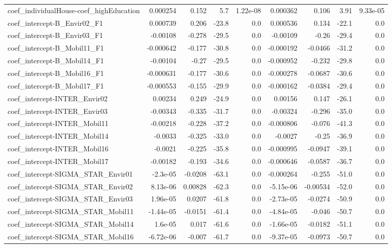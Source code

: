 \begin{tabular}{lrrrrrrrr}
coef_individualHouse-coef_highEducation & 0.000254 & 0.152 & 5.7 & 1.22e-08 & 0.000362 & 0.106 & 3.91 & 9.33e-05 \\
coef_intercept-B_Envir02_F1 & 0.000739 & 0.206 & -23.8 & 0.0 & 0.000536 & 0.134 & -22.1 & 0.0 \\
coef_intercept-B_Envir03_F1 & -0.00108 & -0.278 & -29.5 & 0.0 & -0.00109 & -0.26 & -29.4 & 0.0 \\
coef_intercept-B_Mobil11_F1 & -0.000642 & -0.177 & -30.8 & 0.0 & -0.000192 & -0.0466 & -31.2 & 0.0 \\
coef_intercept-B_Mobil14_F1 & -0.00104 & -0.27 & -29.5 & 0.0 & -0.000952 & -0.232 & -29.8 & 0.0 \\
coef_intercept-B_Mobil16_F1 & -0.000631 & -0.177 & -30.6 & 0.0 & -0.000278 & -0.0687 & -30.6 & 0.0 \\
coef_intercept-B_Mobil17_F1 & -0.000553 & -0.155 & -29.9 & 0.0 & -0.000162 & -0.0384 & -29.4 & 0.0 \\
coef_intercept-INTER_Envir02 & 0.00234 & 0.249 & -24.9 & 0.0 & 0.00156 & 0.147 & -26.1 & 0.0 \\
coef_intercept-INTER_Envir03 & -0.00343 & -0.335 & -31.7 & 0.0 & -0.00324 & -0.296 & -35.0 & 0.0 \\
coef_intercept-INTER_Mobil11 & -0.00218 & -0.228 & -37.2 & 0.0 & -0.000806 & -0.076 & -41.3 & 0.0 \\
coef_intercept-INTER_Mobil14 & -0.0033 & -0.325 & -33.0 & 0.0 & -0.0027 & -0.25 & -36.9 & 0.0 \\
coef_intercept-INTER_Mobil16 & -0.0021 & -0.225 & -35.8 & 0.0 & -0.000995 & -0.0947 & -39.1 & 0.0 \\
coef_intercept-INTER_Mobil17 & -0.00182 & -0.193 & -34.6 & 0.0 & -0.000646 & -0.0587 & -36.7 & 0.0 \\
coef_intercept-SIGMA_STAR_Envir01 & -2.3e-05 & -0.0208 & -63.1 & 0.0 & -0.000264 & -0.255 & -51.0 & 0.0 \\
coef_intercept-SIGMA_STAR_Envir02 & 8.13e-06 & 0.00828 & -62.3 & 0.0 & -5.15e-06 & -0.00534 & -52.0 & 0.0 \\
coef_intercept-SIGMA_STAR_Envir03 & 1.96e-05 & 0.0207 & -61.8 & 0.0 & -2.73e-05 & -0.0274 & -50.9 & 0.0 \\
coef_intercept-SIGMA_STAR_Mobil11 & -1.44e-05 & -0.0151 & -61.4 & 0.0 & -4.84e-05 & -0.046 & -50.7 & 0.0 \\
coef_intercept-SIGMA_STAR_Mobil14 & 1.6e-05 & 0.017 & -61.6 & 0.0 & -1.66e-05 & -0.0182 & -51.1 & 0.0 \\
coef_intercept-SIGMA_STAR_Mobil16 & -6.72e-06 & -0.007 & -61.7 & 0.0 & -9.37e-05 & -0.0973 & -50.7 & 0.0 \\

\end{tabular}
